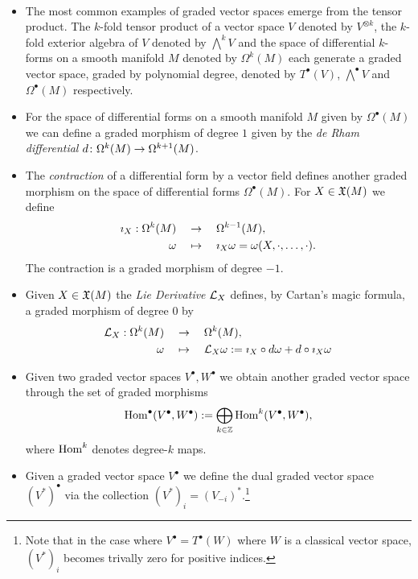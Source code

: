 \begin{example}~
  \begin{itemize}
    \item The most common examples of graded vector spaces emerge from the tensor product. The $k$-fold tensor product of a vector space $V$ denoted by $V^{\otimes k}$, the $k$-fold exterior algebra of $V$ denoted by $\bigwedge^k V$ and the space of differential $k$-forms on a smooth manifold $M$ denoted by $\Omega^k(M)$ each generate a graded vector space, graded by polynomial degree, denoted by $T^\bullet(V)$, $\bigwedge^\bullet V$ and $\Omega^\bullet(M)$ respectively.

    \item For the space of differential forms on a smooth manifold $M$ given by $\Omega^\bullet(M)$ we can define a  graded morphism of degree $1$ given by the \emph{de Rham differential} $d\colon \Omega^k(M) \rightarrow \Omega^{k+1}(M)$.

    \item The \emph{contraction} of a differential form by a vector field defines another graded morphism on the space of differential forms $\Omega^\bullet(M)$. For $X \in \mathfrak{X}(M)$ we define
     \begin{align}
       \imath_X : \Omega^k(M)\quad &\rightarrow \quad\Omega^{k-1}(M),\\
       \omega\quad  &\mapsto \quad \imath_X\omega = \omega (X, \cdot, \dots, \cdot).
     \end{align}
    The contraction is a graded morphism of degree $-1$.

    \item Given $X \in \mathfrak{X}(M)$ the \emph{Lie Derivative} $\mathcal{L}_{X}$ defines, by Cartan's magic formula, a graded morphism of degree $0$ by
      \begin{align}
        \mathcal{L}_{X} : \Omega^k(M)\quad &\rightarrow \quad\Omega^{k}(M),\\
        \omega\quad  &\mapsto \quad \mathcal{L}_{X}\omega := \imath_X \circ d\omega + d \circ \imath_X\omega
      \end{align}

    \item Given two graded vector spaces $V^\bullet, W^\bullet$ we obtain another graded vector space through the set of graded morphisms
    $$ \operatorname{Hom}^\bullet(V^\bullet, W^\bullet) := \bigoplus_{k\in\mathbb{Z}} \operatorname{Hom}^k(V^\bullet, W^\bullet), $$
    where $\operatorname{Hom}^k$ denotes degree-$k$ maps.

     \item Given a graded vector space $V^\bullet$ we define the dual graded vector space $(V^*)^\bullet$ via the collection $(V^*)_i=(V_{-i})^*$.\footnote{Note that in the case where $V^\bullet=T^\bullet(W)$ where $W$ is a classical vector space, $(V^*)_i$  becomes trivally zero for positive indices.}
  \end{itemize}
\end{example}

